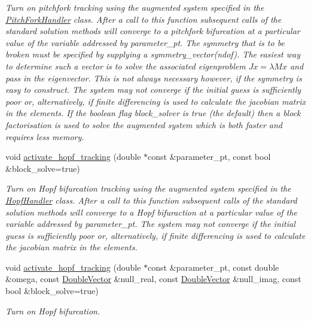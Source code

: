 \begin{DoxyCompactItemize}
\begin{DoxyCompactList}\small\item\em Turn on pitchfork tracking using the augmented system specified in the \hyperlink{classoomph_1_1PitchForkHandler}{Pitch\+Fork\+Handler} class. After a call to this function subsequent calls of the standard solution methods will converge to a pitchfork bifurcation at a particular value of the variable addressed by parameter\+\_\+pt. The symmetry that is to be broken must be specified by supplying a symmetry\+\_\+vector(ndof). The easiest way to determine such a vector is to solve the associated eigenproblem $ Jx = \lambda M x$ and pass in the eigenvector. This is not always necessary however, if the symmetry is easy to construct. The system may not converge if the initial guess is sufficiently poor or, alternatively, if finite differencing is used to calculate the jacobian matrix in the elements. If the boolean flag block\+\_\+solver is true (the default) then a block factorisation is used to solve the augmented system which is both faster and requires less memory. \end{DoxyCompactList}\item 
void \hyperlink{classoomph_1_1Problem_ac5966d1a184e722195f96d797b52e64c}{activate\+\_\+hopf\+\_\+tracking} (double $\ast$const \&parameter\+\_\+pt, const bool \&block\+\_\+solve=true)
\begin{DoxyCompactList}\small\item\em Turn on Hopf bifurcation tracking using the augmented system specified in the \hyperlink{classoomph_1_1HopfHandler}{Hopf\+Handler} class. After a call to this function subsequent calls of the standard solution methods will converge to a Hopf bifuraction at a particular value of the variable addressed by parameter\+\_\+pt. The system may not converge if the initial guess is sufficiently poor or, alternatively, if finite differencing is used to calculate the jacobian matrix in the elements. \end{DoxyCompactList}\item 
void \hyperlink{classoomph_1_1Problem_aa0e2d0e105da6b676262d75481bcc8e3}{activate\+\_\+hopf\+\_\+tracking} (double $\ast$const \&parameter\+\_\+pt, const double \&omega, const \hyperlink{classoomph_1_1DoubleVector}{Double\+Vector} \&null\+\_\+real, const \hyperlink{classoomph_1_1DoubleVector}{Double\+Vector} \&null\+\_\+imag, const bool \&block\+\_\+solve=true)
\begin{DoxyCompactList}\small\item\em Turn on Hopf bifurcation. \end{DoxyCompactList}\item 

\end{DoxyCompactItemize}
